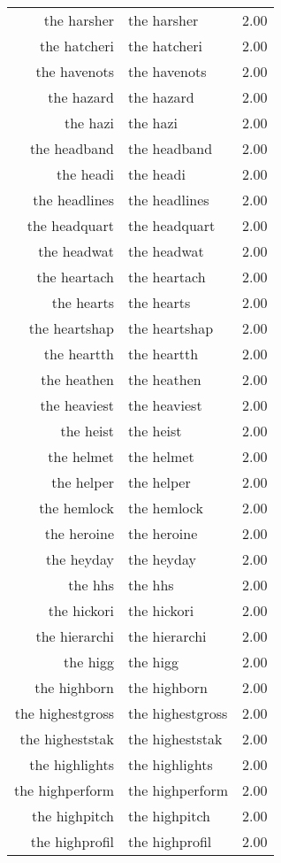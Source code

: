 \begin{table}[ht]
\begin{tabular}{rlr}
  the harsher & the harsher & 2.00 \\ 
  the hatcheri & the hatcheri & 2.00 \\ 
  the havenots & the havenots & 2.00 \\ 
  the hazard & the hazard & 2.00 \\ 
  the hazi & the hazi & 2.00 \\ 
  the headband & the headband & 2.00 \\ 
  the headi & the headi & 2.00 \\ 
  the headlines & the headlines & 2.00 \\ 
  the headquart & the headquart & 2.00 \\ 
  the headwat & the headwat & 2.00 \\ 
  the heartach & the heartach & 2.00 \\ 
  the hearts & the hearts & 2.00 \\ 
  the heartshap & the heartshap & 2.00 \\ 
  the heartth & the heartth & 2.00 \\ 
  the heathen & the heathen & 2.00 \\ 
  the heaviest & the heaviest & 2.00 \\ 
  the heist & the heist & 2.00 \\ 
  the helmet & the helmet & 2.00 \\ 
  the helper & the helper & 2.00 \\ 
  the hemlock & the hemlock & 2.00 \\ 
  the heroine & the heroine & 2.00 \\ 
  the heyday & the heyday & 2.00 \\ 
  the hhs & the hhs & 2.00 \\ 
  the hickori & the hickori & 2.00 \\ 
  the hierarchi & the hierarchi & 2.00 \\ 
  the higg & the higg & 2.00 \\ 
  the highborn & the highborn & 2.00 \\ 
  the highestgross & the highestgross & 2.00 \\ 
  the higheststak & the higheststak & 2.00 \\ 
  the highlights & the highlights & 2.00 \\ 
  the highperform & the highperform & 2.00 \\ 
  the highpitch & the highpitch & 2.00 \\ 
  the highprofil & the highprofil & 2.00 \\ 

\end{tabular}
\end{table}
